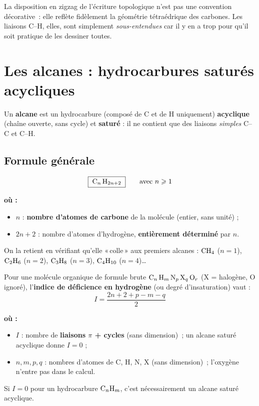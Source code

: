 \documentclass[11pt,a4paper]{article}
\newenvironment{ou}{%
  \par\smallskip\noindent\textbf{où :}\nopagebreak
  \begin{itemize}[leftmargin=1.8em,topsep=2pt,itemsep=1.5pt,parsep=0pt]}%
  {\end{itemize}}
\begin{document}
\begin{remarque}
La disposition en zigzag de l'écriture topologique n'est pas une convention décorative~: elle reflète fidèlement la géométrie tétraédrique des carbones. Les liaisons C--H, elles, sont simplement \emph{sous-entendues} car il y en a trop pour qu'il soit pratique de les dessiner toutes.
\end{remarque}

\section{Les alcanes : hydrocarbures saturés acycliques}
\begin{definition}[Alcane]
Un \textbf{alcane} est un hydrocarbure (composé de C et de H uniquement) \textbf{acyclique} (chaîne ouverte, sans cycle) et \textbf{saturé} : il ne contient que des liaisons \emph{simples} C--C et C--H.
\end{definition}

\subsection{Formule générale}
\begin{formule}
\[
\boxed{\;\ce{C_n H_{2n+2}}\;}
\qquad\text{avec } n\geqslant 1
\]
\begin{ou}
  \item $n$ : \textbf{nombre d'atomes de carbone} de la molécule (entier, sans unité) ;
  \item $2n+2$ : nombre d'atomes d'hydrogène, \textbf{entièrement déterminé} par $n$.
\end{ou}
On la retient en vérifiant qu'elle «\,colle\,» aux premiers alcanes :
$\ce{CH4}$ ($n=1$), $\ce{C2H6}$ ($n=2$), $\ce{C3H8}$ ($n=3$), $\ce{C4H10}$ ($n=4$)\dots
\end{formule}

\begin{theoreme}
Pour une molécule organique de formule brute $\ce{C_n H_m N_p X_q O_r}$ (X = halogène, O ignoré), l'\textbf{indice de déficience en hydrogène} (ou degré d'insaturation) vaut :
\[
\boxed{\;I = \dfrac{2n+2 + p - m - q}{2}\;}
\]
\begin{ou}
  \item $I$ : nombre de \textbf{liaisons $\pi$ + cycles} (sans dimension)~; un alcane saturé acyclique donne $I=0$ ;
  \item $n,m,p,q$ : nombres d'atomes de C, H, N, X (sans dimension)~; l'oxygène n'entre pas dans le calcul.
\end{ou}
Si $I=0$ pour un hydrocarbure $\ce{C_nH_m}$, c'est nécessairement un alcane saturé acyclique.
\end{theoreme}
\end{document}
